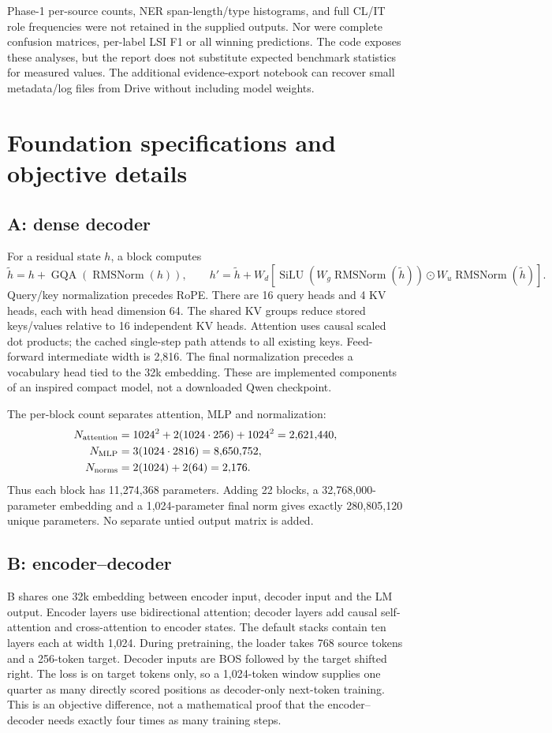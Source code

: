 Phase-1 per-source counts, NER span-length/type histograms, and full CL/IT role frequencies were not
retained in the supplied outputs. Nor were complete confusion matrices, per-label LSI F1 or all winning
predictions. The code exposes these analyses, but the report does not substitute expected benchmark
statistics for measured values. The additional evidence-export notebook can recover small metadata/log
files from Drive without including model weights.

\section{Foundation specifications and objective details}
\label{app:architectures}
\subsection{A: dense decoder}
For a residual state $h$, a block computes
\[
\tilde h=h+\operatorname{GQA}(\operatorname{RMSNorm}(h)),\qquad
h'=\tilde h+W_d[\operatorname{SiLU}(W_g\operatorname{RMSNorm}(\tilde h))
\odot W_u\operatorname{RMSNorm}(\tilde h)].
\]
Query/key normalization precedes RoPE. There are 16 query heads and 4 KV heads, each with head dimension
64. The shared KV groups reduce stored keys/values relative to 16 independent KV heads. Attention uses
causal scaled dot products; the cached single-step path attends to all existing keys. Feed-forward
intermediate width is 2,816. The final normalization precedes a vocabulary head tied to the 32k embedding.
These are implemented components of an inspired compact model, not a downloaded Qwen checkpoint.

The per-block count separates attention, MLP and normalization:
\begin{align*}
N_{\rm attention}&=1024^2+2(1024\cdot256)+1024^2=2{,}621{,}440,\\
N_{\rm MLP}&=3(1024\cdot2816)=8{,}650{,}752,\\
N_{\rm norms}&=2(1024)+2(64)=2{,}176.
\end{align*}
Thus each block has 11,274,368 parameters. Adding 22 blocks, a 32,768,000-parameter embedding and a
1,024-parameter final norm gives exactly 280,805,120 unique parameters. No separate untied output
matrix is added.

\subsection{B: encoder--decoder}
B shares one 32k embedding between encoder input, decoder input and the LM output. Encoder layers use
bidirectional attention; decoder layers add causal self-attention and cross-attention to encoder states.
The default stacks contain ten layers each at width 1,024. During pretraining, the loader takes 768
source tokens and a 256-token target. Decoder inputs are BOS followed by the target shifted right.
The loss is on target tokens only, so a 1,024-token window supplies one quarter as many directly scored
positions as decoder-only next-token training. This is an objective difference, not a mathematical proof
that the encoder--decoder needs exactly four times as many training steps.

